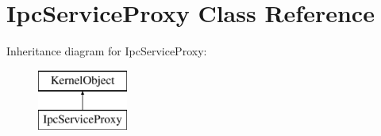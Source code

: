 \hypertarget{class_ipc_service_proxy}{}\section{Ipc\+Service\+Proxy Class Reference}
\label{class_ipc_service_proxy}
Inheritance diagram for Ipc\+Service\+Proxy\+:\begin{figure}[H]
\begin{center}
\leavevmode
\includegraphics[height=2.000000cm]{class_ipc_service_proxy}
\end{center}
\end{figure}
